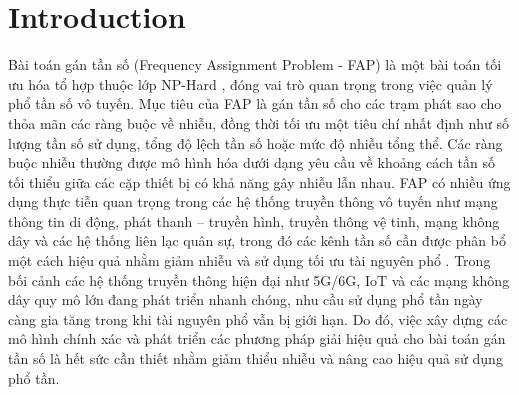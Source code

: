 \documentclass[letterpaper,journal]{IEEEtran}
\begin{document}
\section{Introduction}

Bài toán gán tần số (Frequency Assignment Problem - FAP) là một bài toán tối ưu hóa tổ hợp thuộc lớp NP-Hard \cite{murphey1999fap,Aardal2007,Mahmoudi2023}, đóng vai trò quan trọng trong việc quản lý phổ tần số vô tuyến. 
Mục tiêu của FAP là gán tần số cho các trạm phát sao cho thỏa mãn các ràng buộc về nhiễu, đồng thời tối ưu một tiêu chí nhất định như số lượng tần số sử dụng, tổng độ lệch tần số hoặc mức độ nhiễu tổng thể. Các ràng buộc nhiễu thường được mô hình hóa dưới dạng yêu cầu về khoảng cách tần số tối thiểu giữa các cặp thiết bị có khả năng gây nhiễu lẫn nhau.
FAP có nhiều ứng dụng thực tiễn quan trọng trong các hệ thống truyền thông vô tuyến như mạng thông tin di động, phát thanh – truyền hình, truyền thông vệ tinh, mạng không dây và các hệ thống liên lạc quân sự, trong đó các kênh tần số cần được phân bổ một cách hiệu quả nhằm giảm nhiễu và sử dụng tối ưu tài nguyên phổ \cite{Aardal2007,Mahmoudi2023}.
Trong bối cảnh các hệ thống truyền thông hiện đại như 5G/6G, IoT và các mạng không dây quy mô lớn đang phát triển nhanh chóng, nhu cầu sử dụng phổ tần ngày càng gia tăng trong khi tài nguyên phổ vẫn bị giới hạn. Do đó, việc xây dựng các mô hình chính xác và phát triển các phương pháp giải hiệu quả cho bài toán gán tần số là hết sức cần thiết nhằm giảm thiểu nhiễu và nâng cao hiệu quả sử dụng phổ tần.
\end{document}
